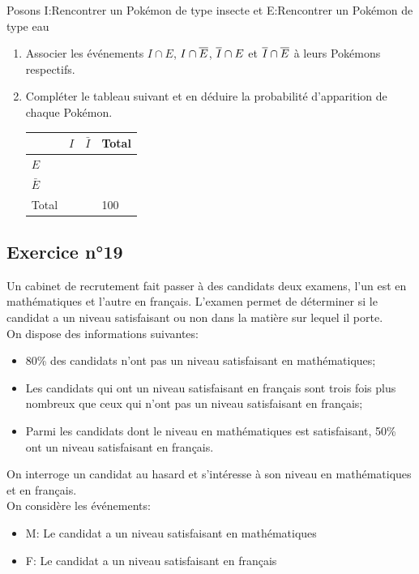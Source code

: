 \documentclass[12pt,a4paper]{article}
\begin{document}
Posons I:\og Rencontrer un Pokémon de type insecte \fg et E:\og Rencontrer un Pokémon de type eau \fg{}

\begin{enumerate}
    \item Associer les événements $I\cap E$, $I \cap \overline{E}$, $\overline{I}\cap E$ et $\overline{I}\cap \overline{E}$ à leurs Pokémons respectifs.
    \item Compléter le tableau suivant et en déduire la probabilité d'apparition de chaque Pokémon.
\begin{center}


\begin{tabular}{|p{2.5cm}|p{4cm}|p{4cm}|p{2.5cm}|} \hline
 & $I$ &$\bar{I}$& Total \\ \hline
$E$&  & & \\ \hline
 $\bar{E}$ & & & \\ \hline
Total & & & 100\\ \hline
\end{tabular} 
   
\end{center}
\end{enumerate}

\subsection*{Exercice n°19}

Un cabinet de recrutement fait passer à des candidats deux examens, l'un est en mathématiques et l'autre en français. L'examen permet de déterminer si le candidat a un niveau satisfaisant ou non dans la matière sur lequel il porte.\\
On dispose des informations suivantes:
\begin{itemize}
    \item 80\% des candidats n'ont pas un niveau satisfaisant en mathématiques;
    \item Les candidats qui ont un niveau satisfaisant en français sont trois fois plus nombreux que ceux qui n'ont pas un niveau satisfaisant en français;
    \item Parmi les candidats dont le niveau en mathématiques est satisfaisant, 50\% ont un niveau satisfaisant en français.
\end{itemize}
On interroge un candidat au hasard et s'intéresse à son niveau en mathématiques et en français.\\
On considère les événements:

\begin{itemize}
    \item M: \og Le candidat a un niveau satisfaisant en mathématiques \fg
    \item F: \og Le candidat a un niveau satisfaisant en français \fg
\end{itemize}
\end{document}
